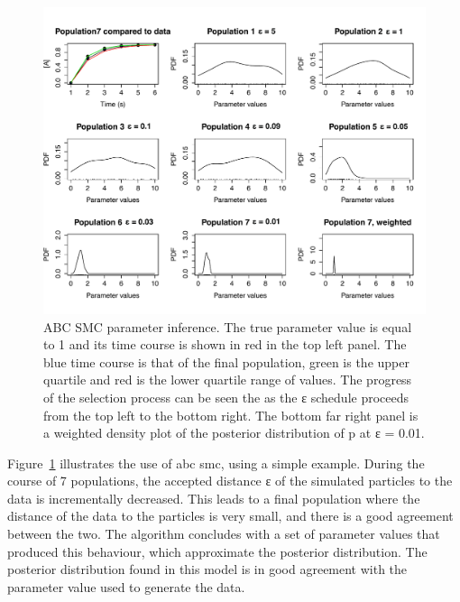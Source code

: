 \begin{figure}[htbp]
    \begin{center}
    \includegraphics[scale=0.6]{../../chapters/chapterIntroduction/images/abc_smc_example.pdf}
    \caption[\acrshort{abc} \acrshort{smc} parameter inference example]{ABC SMC parameter inference. The true parameter value is equal to 1 and its time course is shown in red in the top left panel. The blue time course is that of the final population, green is the upper quartile and red is the lower quartile range of values. The progress of the selection process can be seen the as the ε schedule proceeds from the top left to the bottom right. The bottom far right panel is a weighted density plot of the posterior distribution of p at ε = 0.01.}
    \label{fig:myABC true 1}
    \end{center}
\end{figure}


Figure~\ref{fig:myABC true 1} illustrates the use of \acrshort{abc} \acrshort{smc}, using a simple example. During the course of 7 populations, the accepted distance ε of the simulated particles to the data is incrementally decreased. This leads to a final population where the distance of the data to the particles is very small, and there is a good agreement between the two. The algorithm concludes with a set of parameter values that produced this behaviour, which approximate the posterior distribution. The posterior distribution found in this model is in good agreement with the parameter value used to generate the data. 

